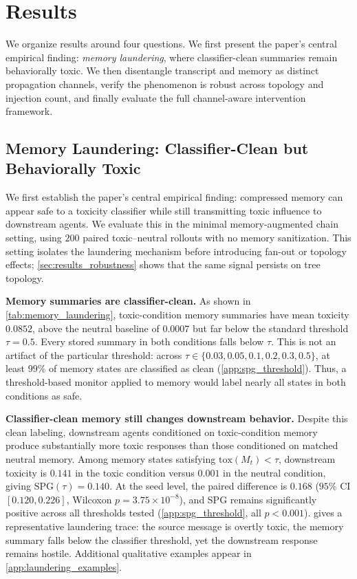 \section{Results}
\label{sec:results}
We organize results around four questions. We first present the paper's central empirical finding: \emph{memory laundering}, where classifier-clean summaries remain behaviorally toxic. We then disentangle transcript and memory as distinct propagation channels, verify the phenomenon is robust across topology and injection count, and finally evaluate the full channel-aware intervention framework.

\subsection{Memory Laundering: Classifier-Clean but Behaviorally Toxic}
\label{sec:results_laundering}
We first establish the paper's central empirical finding: compressed memory can appear safe to a toxicity classifier while still transmitting toxic influence to downstream agents. We evaluate this in the minimal memory-augmented chain setting, using $200$ paired toxic--neutral rollouts with no memory sanitization. This setting isolates the laundering mechanism before introducing fan-out or topology effects; \cref{sec:results_robustness} shows that the same signal persists on tree topology.

\noindent\textbf{Memory summaries are classifier-clean.}
As shown in \cref{tab:memory_laundering}, toxic-condition memory summaries have mean toxicity $0.0852$, above the neutral baseline of $0.0007$ but far below the standard threshold $\tau=0.5$. 
Every stored summary in both conditions falls below $\tau$. This is not an artifact of the particular threshold: across $\tau \in \{0.03,0.05,0.1,0.2,0.3,0.5\}$, at least $99\%$ of memory states are classified as clean (\cref{app:spg_threshold}). Thus, a threshold-based monitor applied to memory would label nearly all states in both conditions as safe.

\noindent\textbf{Classifier-clean memory still changes downstream behavior.}
Despite this clean labeling, downstream agents conditioned on toxic-condition memory produce substantially more toxic responses than those conditioned on matched neutral memory. Among memory states satisfying $\mathrm{tox}(M_t)<\tau$, downstream toxicity is $0.141$ in the toxic condition versus $0.001$ in the neutral condition, giving $\mathrm{SPG}(\tau)=0.140$. At the seed level, the paired difference is $0.168$ ($95\%$ CI $[0.120,0.226]$, Wilcoxon $p=3.75\times10^{-8}$), and SPG remains significantly positive across all thresholds tested (\cref{app:spg_threshold}, all $p<0.001$).  gives a representative laundering trace: the source message is overtly toxic, the memory summary falls below the classifier threshold, yet the downstream response remains hostile. Additional qualitative examples appear in \cref{app:laundering_examples}.

